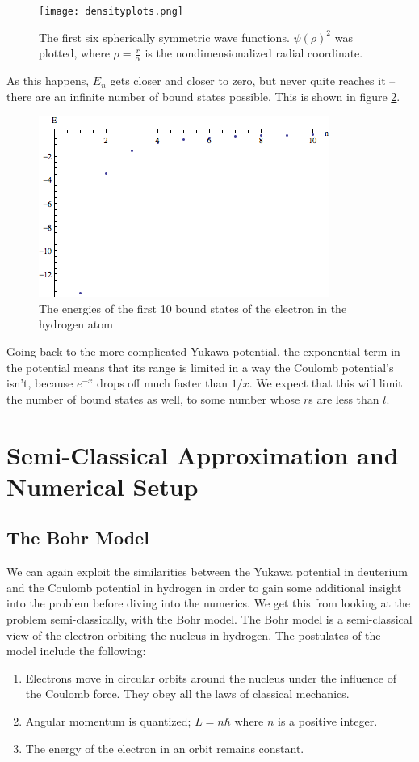 \documentclass[12pt,twoside]{reedthesis}
\begin{document}
\begin{figure}
\texttt{[image: densityplots.png]}
\caption{The first six spherically symmetric wave functions. $\psi(\rho)^2$ was plotted, where $\rho = \frac{r}{\alpha}$ is the nondimensionalized radial coordinate.}
\label{fig:hfuncs}
\end{figure}
As this happens, $E_n$ gets closer and closer to zero, but never quite reaches it -- there are an infinite number of bound states possible. This is shown in figure \ref{fig:hspec}.
\begin{figure}[h]
\includegraphics[scale=0.75]{hydrogenspectrum.png}
\caption{The energies of the first 10 bound states of the electron in the hydrogen atom}
\label{fig:hspec}
\end{figure}

Going back to the more-complicated Yukawa potential, the exponential term in the potential means that its range is limited in a way the Coulomb potential's isn't, because $e^{-x}$ drops off much faster than $1/x$. We expect that this will limit the number of bound states as well, to some number whose $r$s are less than $l$.

\clearpage %

\chapter{Semi-Classical Approximation and Numerical Setup}
\section{The Bohr Model}
We can again exploit the similarities between the Yukawa potential in deuterium and the Coulomb potential in hydrogen in order to gain some additional insight into the problem before diving into the numerics. We get this from looking at the problem semi-classically, with the Bohr model. The Bohr model is a semi-classical view of the electron orbiting the nucleus in hydrogen. The postulates of the model include the following:
\begin{enumerate}
\item Electrons move in circular orbits around the nucleus under the influence of the Coulomb force. They obey all the laws of classical mechanics.
\item Angular momentum is quantized; $L = n\hbar$ where $n$ is a positive integer.
\item The energy of the electron in an orbit remains constant.
\end{enumerate}
\end{document}
